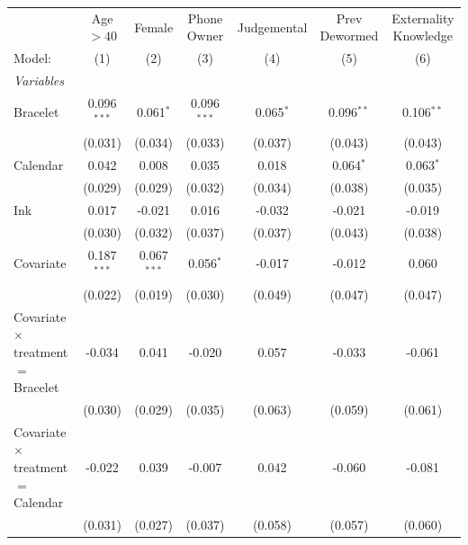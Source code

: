 
\begingroup
\centering
\begin{tabular}{lcccccc}
   \tabularnewline \midrule \midrule
                                              & Age $>40$      & Female        & Phone Owner   & Judgemental & Prev Dewormed & Externality Knowledge \\   
   Model:                                     & (1)            & (2)           & (3)           & (4)         & (5)           & (6)\\  
   \midrule
   \emph{Variables}\\
   Bracelet                                   & 0.096$^{***}$  & 0.061$^{*}$   & 0.096$^{***}$ & 0.065$^{*}$ & 0.096$^{**}$  & 0.106$^{**}$\\   
                                              & (0.031)        & (0.034)       & (0.033)       & (0.037)     & (0.043)       & (0.043)\\   
   Calendar                                   & 0.042          & 0.008         & 0.035         & 0.018       & 0.064$^{*}$   & 0.063$^{*}$\\   
                                              & (0.029)        & (0.029)       & (0.032)       & (0.034)     & (0.038)       & (0.035)\\   
   Ink                                        & 0.017          & -0.021        & 0.016         & -0.032      & -0.021        & -0.019\\   
                                              & (0.030)        & (0.032)       & (0.037)       & (0.037)     & (0.043)       & (0.038)\\   
   \midrule
      Covariate                               & 0.187$^{***}$  & 0.067$^{***}$ & 0.056$^{*}$   & -0.017      & -0.012        & 0.060\\   
                                              & (0.022)        & (0.019)       & (0.030)       & (0.049)     & (0.047)       & (0.047)\\   
   Covariate $\times$ treatment $=$ Bracelet  & -0.034         & 0.041         & -0.020        & 0.057       & -0.033        & -0.061\\   
                                              & (0.030)        & (0.029)       & (0.035)       & (0.063)     & (0.059)       & (0.061)\\   
   Covariate $\times$ treatment $=$ Calendar  & -0.022         & 0.039         & -0.007        & 0.042       & -0.060        & -0.081\\   
                                              & (0.031)        & (0.027)       & (0.037)       & (0.058)     & (0.057)       & (0.060)\\   

\end{tabular}

